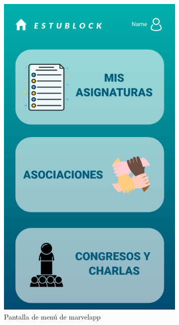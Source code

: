 \begin{figure}[hbt]
	\centering
	\begin{subfigure}[b]{0.4\linewidth}
		\centering
        \includegraphics[width=0.7\linewidth]{figs/Desarrollo/Interfaz/marvel_menu}
        \caption[Marvel Menú]{Pantalla de menú de marvelapp}
	\end{subfigure} 
	\begin{subfigure}[b]{0.4\linewidth}
		\centering

\end{subfigure}
\end{figure}
